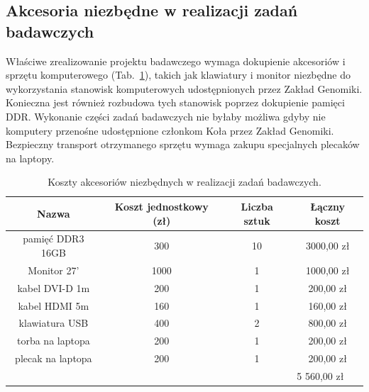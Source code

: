 \documentclass{article}
\begin{document}
\subsection{Akcesoria niezbędne w realizacji zadań badawczych}

Właściwe zrealizowanie projektu badawczego wymaga dokupienie akcesoriów i 
sprzętu komputerowego (Tab.~\ref{tab:akcesoria}), takich jak klawiatury i 
monitor niezbędne do wykorzystania stanowisk komputerowych udostępnionych przez 
Zakład Genomiki. Konieczna jest również rozbudowa tych stanowisk poprzez 
dokupienie pamięci DDR. Wykonanie części zadań badawczych nie byłaby możliwa 
gdyby nie komputery przenośne udostępnione członkom Koła przez Zakład Genomiki. 
Bezpieczny transport otrzymanego sprzętu wymaga zakupu specjalnych plecaków na 
laptopy.

\begin{table}[]
\centering
\caption{Koszty akcesoriów niezbędnych w realizacji zadań badawczych.}
\label{tab:akcesoria}
\begin{tabular}{cccc}
\hline
\multicolumn{1}{|c|}{Nazwa}             & \multicolumn{1}{c|}{Koszt jednostkowy (zł)} 
& \multicolumn{1}{c|}{Liczba sztuk} & \multicolumn{1}{c|}{Łączny koszt} \\ 
\hline
\multicolumn{1}{|c|}{pamięć DDR3 16GB}   & \multicolumn{1}{c|}{300}               
& \multicolumn{1}{c|}{10}           & \multicolumn{1}{c|}{3000,00 zł}   \\ 
\hline
\multicolumn{1}{|c|}{Monitor 27’}       & \multicolumn{1}{c|}{1000}              
& \multicolumn{1}{c|}{1}            & \multicolumn{1}{c|}{1000,00 zł}   \\ 
\hline
\multicolumn{1}{|c|}{kabel DVI-D 1m}    & \multicolumn{1}{c|}{200}               
& \multicolumn{1}{c|}{1}            & \multicolumn{1}{c|}{200,00 zł}    \\ 
\hline
\multicolumn{1}{|c|}{kabel HDMI 5m}     & \multicolumn{1}{c|}{160}               
& \multicolumn{1}{c|}{1}            & \multicolumn{1}{c|}{160,00 zł}    \\ 
\hline
\multicolumn{1}{|c|}{klawiatura USB}    & \multicolumn{1}{c|}{400}               
& \multicolumn{1}{c|}{2}            & \multicolumn{1}{c|}{800,00 zł}    \\ 
\hline
\multicolumn{1}{|c|}{torba na laptopa}  & \multicolumn{1}{c|}{200}               
& \multicolumn{1}{c|}{1}            & \multicolumn{1}{c|}{200,00 zł}    \\ 
\hline
\multicolumn{1}{|c|}{plecak na laptopa} & \multicolumn{1}{c|}{200}               
& \multicolumn{1}{c|}{1}            & \multicolumn{1}{c|}{200,00 zł}    \\ 
\hline
\multicolumn{1}{l}{}                    & \multicolumn{1}{l}{}                   
& \multicolumn{1}{l}{}              & \multicolumn{1}{l}{5 560,00 zł}   
\end{tabular}
\end{table}
\end{document}
